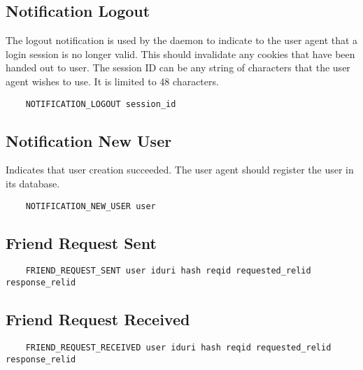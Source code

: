 \documentclass[letterpaper,11pt,oneside]{article}
\begin{document}
\subsection{Notification Logout}

The logout notification is used by the daemon to indicate to the user agent
that a login session is no longer valid. This should invalidate any cookies
that have been handed out to user. The session ID can be any string of
characters that the user agent wishes to use. It is limited to 48 characters.

\vspace{10pt}
\begin{verbatim}
    NOTIFICATION_LOGOUT session_id
\end{verbatim}
\vspace{10pt}

\subsection{Notification New User}

Indicates that user creation succeeded. The user agent should register the user
in its database.

\vspace{10pt}
\begin{verbatim}
    NOTIFICATION_NEW_USER user
\end{verbatim}
\vspace{10pt}

\subsection{Friend Request Sent}

\vspace{10pt}
\begin{verbatim}
    FRIEND_REQUEST_SENT user iduri hash reqid requested_relid response_relid 
\end{verbatim}
\vspace{10pt}

\subsection{Friend Request Received}

\vspace{10pt}
\begin{verbatim}
    FRIEND_REQUEST_RECEIVED user iduri hash reqid requested_relid response_relid 
\end{verbatim}
\vspace{10pt}
\end{document}
